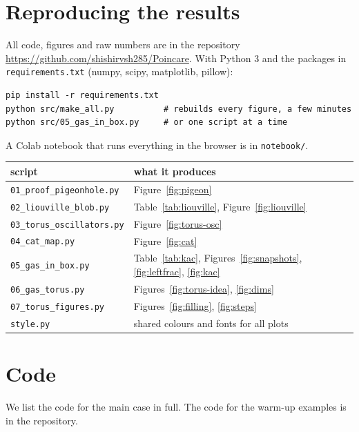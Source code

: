 \documentclass[11pt,a4paper]{article}
\theoremstyle{definition}
\begin{document}
\appendix
\section{Reproducing the results}
\label{app:repro}

All code, figures and raw numbers are in the repository \url{https://github.com/shishirvsh285/Poincare}. With Python 3 and the packages in \texttt{requirements.txt} (numpy, scipy, matplotlib, pillow):
\begin{verbatim}
pip install -r requirements.txt
python src/make_all.py          # rebuilds every figure, a few minutes
python src/05_gas_in_box.py     # or one script at a time
\end{verbatim}
A Colab notebook that runs everything in the browser is in \texttt{notebook/}.

\begin{table}[H]
  \centering
  \small
  \begin{tabular}{ll}
    \toprule
    script & what it produces \\
    \midrule
    \texttt{01\_proof\_pigeonhole.py} & Figure~\ref{fig:pigeon} \\
    \texttt{02\_liouville\_blob.py} & Table~\ref{tab:liouville}, Figure~\ref{fig:liouville} \\
    \texttt{03\_torus\_oscillators.py} & Figure~\ref{fig:torus-osc} \\
    \texttt{04\_cat\_map.py} & Figure~\ref{fig:cat} \\
    \texttt{05\_gas\_in\_box.py} & Table~\ref{tab:kac}, Figures~\ref{fig:snapshots}, \ref{fig:leftfrac}, \ref{fig:kac} \\
    \texttt{06\_gas\_torus.py} & Figures~\ref{fig:torus-idea}, \ref{fig:dims} \\
    \texttt{07\_torus\_figures.py} & Figures~\ref{fig:filling}, \ref{fig:steps} \\
    \texttt{style.py} & shared colours and fonts for all plots \\
    \bottomrule
  \end{tabular}
\end{table}

\section{Code}
\label{app:code}

We list the code for the main case in full. The code for the warm-up examples is in the repository.
\end{document}
